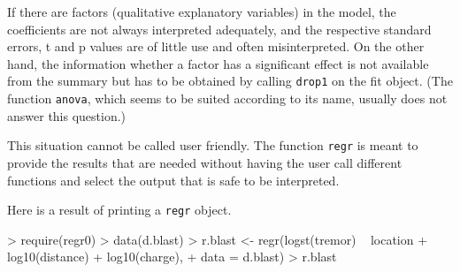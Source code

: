 \documentclass[11pt]{article}
\providecommand{\T}{\texttt}
\begin{document}
If there are factors (qualitative explanatory variables) in the model, 
the coefficients are not always interpreted adequately, and the 
respective standard errors, t and p values are of little use and often
misinterpreted. 
On the other hand, the information whether a factor has a significant
effect is not available from the summary but has to be obtained by calling 
\T{drop1} on the fit object. 
(The function \T{anova}, which seems to be suited according to its
name, usually does not answer this question.)

This situation cannot be called user friendly.
The function \T{regr} is meant to provide the results that are needed
without having the user call different functions and select the 
output that is safe to be interpreted.

Here is a result of printing a \T{regr} object.
\begin{Schunk}
\begin{Sinput}
> require(regr0)
> data(d.blast)
> r.blast <- regr(logst(tremor) ~ location + log10(distance) + log10(charge), 
+     data = d.blast)
> r.blast
\end{Sinput}
\end{Schunk}
\end{document}

